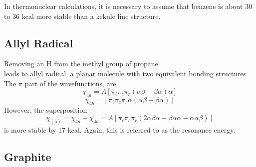 In thermonuclear calculations, it is necessary to assume that 
benzene is about 30 to 36 kcal more stable than a kekule line structure.

\subsection{Allyl Radical}

Removing an H from the methyl group of propane
\begin{equation}
\end{equation}
leads to allyl radical, a planar molecule with two equivalent 
bonding structures
\begin{equation}
\label{chap7-eqno55}
\end{equation}
The $\pi$ part of the wavefunctions, are
\begin{equation}
\chi_{4a} = A \left[ \pi_{\ell} \pi_c \pi_r \left( \alpha \beta - 
\beta \alpha \right) \alpha \right]
\end{equation}
\begin{equation}
\chi_{4b} = \left[ \pi_{\ell} \pi_c \pi_r \alpha \left( \alpha \beta - \beta 
\alpha \right) \right]
\end{equation}
However, the superposition
\begin{equation}
\chi_{(5)} = \chi_{4a} - \chi_{4b} = A \left[ \pi_{\ell} \pi_c \pi_r 
\left( 2 \alpha \beta \alpha - \beta \alpha \alpha - \alpha \alpha 
\beta \right) \right]
\label{chap07-eqno56}
\end{equation}
is more stable by 17 kcal.  Again, this is referred to as the resonance energy.

\subsection{Graphite}

